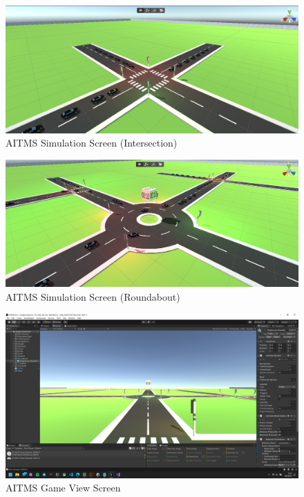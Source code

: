 \documentclass[openany,12pt]{report}
\begin{document}
		\begin{figure}[H]
			\centering
			\includegraphics[width=6in]{./Diagrams/PNG/licescene2}
			\caption{AITMS Simulation Screen (Intersection)}
		\end{figure}
		
		\begin{figure}[H]
			\centering
			\includegraphics[width=6in]{./Diagrams/PNG/livescene}
			\caption{AITMS Simulation Screen (Roundabout)}
		\end{figure}
		
		\begin{figure}[H]
			\centering
			\includegraphics[width=6in]{./Diagrams/PNG/scene2}
			\caption{AITMS Game View Screen}
		\end{figure}
		
\end{document}
